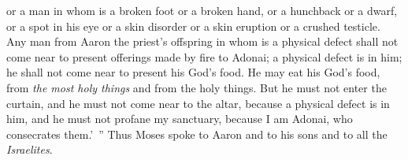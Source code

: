 \begin{biblechapter}
\verse or a man in whom is a broken foot or a broken hand,
\verse or a hunchback or a dwarf, or a spot in his eye or a skin disorder or a skin eruption or a crushed testicle.
\verse Any man from Aaron the priest’s offspring in whom is a physical defect shall not come near to present offerings made by fire to Adonai; a physical defect is in him; he shall not come near to present his God’s food.
\verse He may eat his God’s food, from \textit{the most holy things} and from the holy things.
\verse But he must not enter the curtain, and he must not come near to the altar, because a physical defect is in him, and he must not profane my sanctuary, because I am Adonai, who consecrates them.’ ”
\verse Thus Moses spoke to Aaron and to his sons and to all the \textit{Israelites}.
\end{biblechapter}

